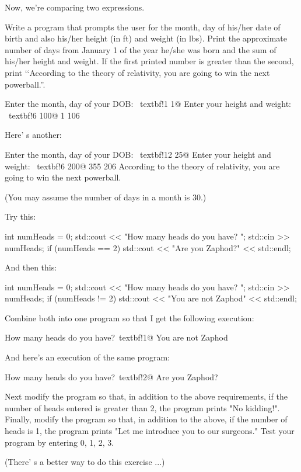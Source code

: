 Now, we're comparing two expressions.

\begin{ex}
Write a program that prompts the user for the month, day of his/her date of birth and also his/her height (in ft) and weight (in lbs). Print the approximate number of days from January 1 of the year he/she was born and the sum of his/her height and weight. If the first printed number is greater than the second, print \lq\lq According to the theory of relativity, you are going to win the next powerball.''.
\begin{console}[commandchars=\~\!\@]
Enter the month, day of your DOB: ~textbf!1 1@
Enter your height and weight: ~textbf!6 100@
1 106
\end{console}
Here' s another:
\begin{console}[commandchars=\~\!\@]
Enter the month, day of your DOB: ~textbf!12 25@
Enter your height and weight: ~textbf!6 200@
355 206
According to the theory of relativity,
you are going to win the next powerball.
\end{console}
(You may assume the number of days in a month is 30.)
\end{ex}

\begin{ex}
Try this:\\
\begin{console}[commandchars=\~\!\@]
int numHeads = 0;
std::cout << "How many heads do you have? ";
std::cin >> numHeads;
if (numHeads == 2)
   std::cout << "Are you Zaphod?" << std::endl;
\end{console}

And then this:

\begin{console}
int numHeads = 0;
std::cout << "How many heads do you have? ";
std::cin >> numHeads;
if (numHeads != 2)
   std::cout << "You are not Zaphod" << std::endl;
\end{console}

Combine both into one program so that I get the following execution:\\
\begin{console}[commandchars=\~\!\@]
How many heads do you have?~textbf!1@
You are not Zaphod
\end{console}
And here's an execution of the same program:\\
\begin{console}[commandchars=\~\!\@]
How many heads do you have?~textbf!2@
Are you Zaphod?
\end{console}
Next modify the program so that, in addition to the above requirements,
if the number of heads entered is greater than 2, the program prints "No
kidding!". Finally, modify the program so that, in addition to the
above, if the number of heads is 1, the program prints "Let me introduce
you to our surgeons." Test your program by entering 0, 1, 2, 3.

(There' s a better way to do this exercise ...)
\end{ex}

